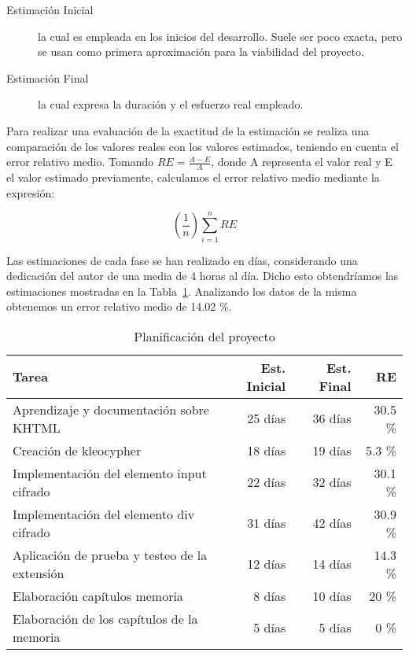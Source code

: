\begin{description}
 \item[Estimación Inicial] la cual es empleada en los inicios del desarrollo. Suele ser poco exacta, pero se usan como primera aproximación para la viabilidad del proyecto.

 \item[Estimación Final] la cual expresa la duración y el esfuerzo real empleado.
\end{description}
 
Para realizar una evaluación de la exactitud de la estimación se realiza una comparación de los valores reales  con los valores estimados, teniendo en cuenta el error relativo medio. Tomando $RE =\frac{A - E}{A}$, donde A  representa el valor real y E el valor estimado previamente, calculamos el error relativo medio mediante la expresión:
    
\begin{displaymath}
\left(\frac{1}{n}\right) \sum_{i=1}^{n} RE   
\end{displaymath}

Las estimaciones de cada fase se han realizado en días, considerando una dedicación del autor de una media de 4 horas al día. Dicho esto obtendríamos las estimaciones mostradas en la Tabla~\ref{tab:planif}.                                       Analizando los datos de la misma obtenemos un error relativo medio de 14.02 \%.                                                     
                                                                
                                                                
\begin{table}
    \centering
        \begin{tabular}{|l|r|r|r|}
            \hline
            \textbf{Tarea} & \textbf{Est. Inicial} & \textbf{Est. Final} & \textbf{RE}\\ \hline \hline
             Aprendizaje y documentación sobre KHTML  & 25 días & 36 días & 30.5 \%  \\
             Creación de kleocypher & 18 días & 19 días & 5.3 \% \\
             Implementación del elemento input cifrado & 22 días & 32 días & 30.1 \%  \\
             Implementación del elemento div cifrado & 31 días & 42 días & 30.9 \%  \\
             Aplicación de prueba y testeo de la extensión & 12 días & 14 días & 14.3  \% \\
             Elaboración capítulos memoria & 8 días & 10 días & 20 \% \\
             Elaboración de los capítulos de la memoria  & 5 días & 5 días & 0 \% \\       
            \hline
        \end{tabular}
    \caption{Planificación del proyecto}
    \label{tab:planif}
\end{table}



